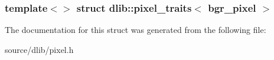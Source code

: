 \subsubsection*{template$<$$>$ struct dlib::pixel\_\-traits$<$ bgr\_\-pixel $>$}



The documentation for this struct was generated from the following file:\begin{DoxyCompactItemize}
\item 
source/dlib/pixel.h\end{DoxyCompactItemize}
